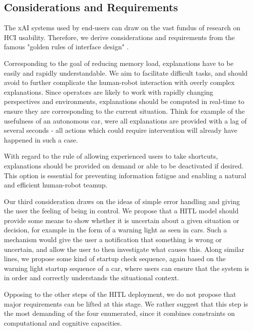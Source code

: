 \documentclass[twoside,11pt]{article}
\begin{document}
\subsection{Considerations and Requirements}

The xAI systems used by end-users can draw on the vast fundus of research on HCI usability. Therefore, we derive considerations and requirements from the famous "golden rules of interface design" \citep{ShneidermanEtAl:2016:GoldenRulesHCI}.

Corresponding to the goal of reducing memory load, explanations have to be easily and rapidly understandable. We aim to facilitate difficult tasks, and should avoid to further complicate the human-robot interaction with overly complex explanations. Since operators are likely to work with rapidly changing perspectives and environments, explanations should be computed in real-time to ensure they are corresponding to the current situation. Think for example of the usefulness of an autonomous car, were all explanations are provided with a lag of several seconds - all actions which could require intervention will already have happened in such a case. 

With regard to the rule of allowing experienced users to take shortcuts, explanations should be provided on demand or able to be deactivated if desired. This option is essential for preventing information fatigue and enabling a natural and efficient human-robot teamup. 

Our third consideration draws on the ideas of simple error handling and giving the user the feeling of being in control. We propose that a HITL model should provide some means to show whether it is uncertain about a given situation or decision, for example in the form of a warning light as seen in cars. Such a mechanism would give the user a notification that something is wrong or uncertain, and allow the user to then investigate what causes this.  Along similar lines, we propose some kind of startup check sequence, again based on the warning light startup sequence of a car, where users can ensure that the system is in order and correctly understands the situational context.

Opposing to the other steps of the HITL deployment, we do not propose that major requirements can be lifted at this stage. We rather suggest that this step is the most demanding of the four enumerated, since it combines constraints on computational and cognitive capacities.
\end{document}
